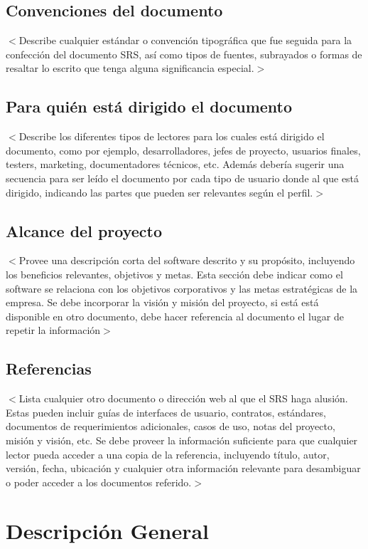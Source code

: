 \documentclass{scrreprt}
\begin{document}
\section{Convenciones del documento}
$<$Describe cualquier estándar o convención tipográfica que fue seguida para la confección del documento SRS, así como tipos de fuentes, subrayados o formas de resaltar lo escrito que tenga alguna significancia especial.$>$

\section{Para quién está dirigido el documento}
$<$Describe los diferentes tipos de lectores para los cuales está dirigido el documento, como por ejemplo, desarrolladores, jefes de proyecto, usuarios finales, testers, marketing, documentadores técnicos, etc.
Además debería sugerir una secuencia para ser leído el documento por cada tipo de usuario donde al que está dirigido, indicando las partes que pueden ser relevantes según el perfil.$>$

\section{Alcance del proyecto}
$<$Provee una descripción corta del software descrito y su propósito, incluyendo los beneficios relevantes, objetivos y metas.
Esta sección debe indicar como el software se relaciona con los objetivos corporativos y las metas estratégicas de la empresa.
Se debe incorporar la visión y misión del proyecto, si está está disponible en otro documento, debe hacer referencia al documento el lugar de repetir la información$>$

\section{Referencias}
$<$Lista cualquier otro documento o dirección web al que el SRS haga alusión.
Estas pueden incluir guías de interfaces de usuario, contratos, estándares, documentos de requerimientos adicionales, casos de uso, notas del proyecto, misión y visión, etc.
Se debe proveer la información suficiente para que cualquier lector pueda acceder a una copia de la referencia, incluyendo título, autor, versión, fecha, ubicación y cualquier otra información relevante para desambiguar o poder acceder a los documentos referido.$>$


\chapter{Descripción General}
\end{document}
